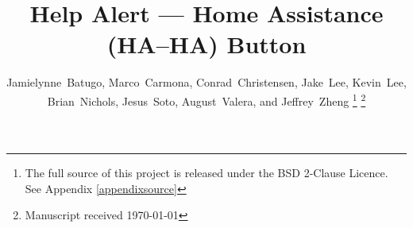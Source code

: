 \documentclass[journal,compsoc]{IEEEtran}
\begin{document}
%
\title{
  Help Alert --- Home Assistance (HA--HA) Button
}
%
%
%

\author{Jamielynne~Batugo, Marco~Carmona, Conrad~Christensen, Jake~Lee, Kevin~Lee, Brian~Nichols, Jesus~Soto, August~Valera, and Jeffrey~Zheng
\thanks{The full source of this project is released under the BSD 2-Clause Licence. See Appendix \ref{appendixsource}}%
\thanks{Manuscript received \today}%
}%

%
%
\end{document}
